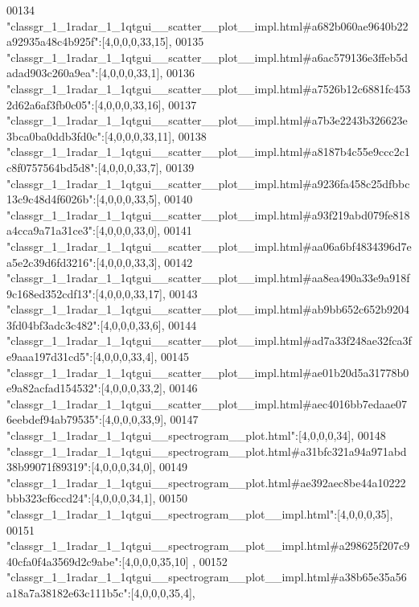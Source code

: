 \begin{DoxyCode}
00134 \textcolor{stringliteral}{"classgr\_1\_1radar\_1\_1qtgui\_\_scatter\_\_plot\_\_impl.html#a682b060ae9640b22a92935a48c4b925f"}:[4,0,0,0,33,15],
00135 \textcolor{stringliteral}{"classgr\_1\_1radar\_1\_1qtgui\_\_scatter\_\_plot\_\_impl.html#a6ac579136e3ffeb5dadad903c260a9ea"}:[4,0,0,0,33,1],
00136 \textcolor{stringliteral}{"classgr\_1\_1radar\_1\_1qtgui\_\_scatter\_\_plot\_\_impl.html#a7526b12c6881fc4532d62a6af3fb0c05"}:[4,0,0,0,33,16],
00137 \textcolor{stringliteral}{"classgr\_1\_1radar\_1\_1qtgui\_\_scatter\_\_plot\_\_impl.html#a7b3e2243b326623e3bca0ba0ddb3fd0c"}:[4,0,0,0,33,11],
00138 \textcolor{stringliteral}{"classgr\_1\_1radar\_1\_1qtgui\_\_scatter\_\_plot\_\_impl.html#a8187b4c55e9ccc2c1c8f0757564bd5d8"}:[4,0,0,0,33,7],
00139 \textcolor{stringliteral}{"classgr\_1\_1radar\_1\_1qtgui\_\_scatter\_\_plot\_\_impl.html#a9236fa458c25dfbbc13c9c48d4f6026b"}:[4,0,0,0,33,5],
00140 \textcolor{stringliteral}{"classgr\_1\_1radar\_1\_1qtgui\_\_scatter\_\_plot\_\_impl.html#a93f219abd079fe818a4cca9a71a31ce3"}:[4,0,0,0,33,0],
00141 \textcolor{stringliteral}{"classgr\_1\_1radar\_1\_1qtgui\_\_scatter\_\_plot\_\_impl.html#aa06a6bf4834396d7ea5e2c39d6fd3216"}:[4,0,0,0,33,3],
00142 \textcolor{stringliteral}{"classgr\_1\_1radar\_1\_1qtgui\_\_scatter\_\_plot\_\_impl.html#aa8ea490a33e9a918f9c168ed352cdf13"}:[4,0,0,0,33,17],
00143 \textcolor{stringliteral}{"classgr\_1\_1radar\_1\_1qtgui\_\_scatter\_\_plot\_\_impl.html#ab9bb652c652b92043fd04bf3adc3c482"}:[4,0,0,0,33,6],
00144 \textcolor{stringliteral}{"classgr\_1\_1radar\_1\_1qtgui\_\_scatter\_\_plot\_\_impl.html#ad7a33f248ae32fca3fe9aaa197d31cd5"}:[4,0,0,0,33,4],
00145 \textcolor{stringliteral}{"classgr\_1\_1radar\_1\_1qtgui\_\_scatter\_\_plot\_\_impl.html#ae01b20d5a31778b0e9a82acfad154532"}:[4,0,0,0,33,2],
00146 \textcolor{stringliteral}{"classgr\_1\_1radar\_1\_1qtgui\_\_scatter\_\_plot\_\_impl.html#aec4016bb7edaae076eebdef94ab79535"}:[4,0,0,0,33,9],
00147 \textcolor{stringliteral}{"classgr\_1\_1radar\_1\_1qtgui\_\_spectrogram\_\_plot.html"}:[4,0,0,0,34],
00148 \textcolor{stringliteral}{"classgr\_1\_1radar\_1\_1qtgui\_\_spectrogram\_\_plot.html#a31bfc321a94a971abd38b99071f89319"}:[4,0,0,0,34,0],
00149 \textcolor{stringliteral}{"classgr\_1\_1radar\_1\_1qtgui\_\_spectrogram\_\_plot.html#ae392aec8be44a10222bbb323cf6ccd24"}:[4,0,0,0,34,1],
00150 \textcolor{stringliteral}{"classgr\_1\_1radar\_1\_1qtgui\_\_spectrogram\_\_plot\_\_impl.html"}:[4,0,0,0,35],
00151 \textcolor{stringliteral}{"classgr\_1\_1radar\_1\_1qtgui\_\_spectrogram\_\_plot\_\_impl.html#a298625f207c940cfa0f4a3569d2c9abe"}:[4,0,0,0,35,10]
      ,
00152 \textcolor{stringliteral}{"classgr\_1\_1radar\_1\_1qtgui\_\_spectrogram\_\_plot\_\_impl.html#a38b65e35a56a18a7a38182e63c111b5c"}:[4,0,0,0,35,4],

\end{DoxyCode}
